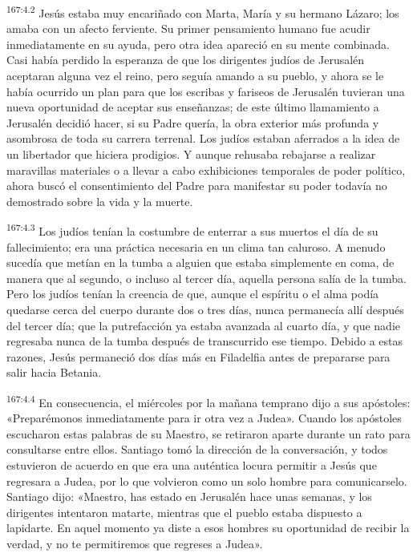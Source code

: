 \par 
\textsuperscript{167:4.2} Jesús estaba muy encariñado con Marta, María y su hermano Lázaro; los amaba con un afecto ferviente. Su primer pensamiento humano fue acudir inmediatamente en su ayuda, pero otra idea apareció en su mente combinada. Casi había perdido la esperanza de que los dirigentes judíos de Jerusalén aceptaran alguna vez el reino, pero seguía amando a su pueblo, y ahora se le había ocurrido un plan para que los escribas y fariseos de Jerusalén tuvieran una nueva oportunidad de aceptar sus enseñanzas; de este último llamamiento a Jerusalén decidió hacer, si su Padre quería, la obra exterior más profunda y asombrosa de toda su carrera terrenal. Los judíos estaban aferrados a la idea de un libertador que hiciera prodigios. Y aunque rehusaba rebajarse a realizar maravillas materiales o a llevar a cabo exhibiciones temporales de poder político, ahora buscó el consentimiento del Padre para manifestar su poder todavía no demostrado sobre la vida y la muerte.

\par 
\textsuperscript{167:4.3} Los judíos tenían la costumbre de enterrar a sus muertos el día de su fallecimiento; era una práctica necesaria en un clima tan caluroso. A menudo sucedía que metían en la tumba a alguien que estaba simplemente en coma, de manera que al segundo, o incluso al tercer día, aquella persona salía de la tumba. Pero los judíos tenían la creencia de que, aunque el espíritu o el alma podía quedarse cerca del cuerpo durante dos o tres días, nunca permanecía allí después del tercer día; que la putrefacción ya estaba avanzada al cuarto día, y que nadie regresaba nunca de la tumba después de transcurrido ese tiempo. Debido a estas razones, Jesús permaneció dos días más en Filadelfia antes de prepararse para salir hacia Betania.

\par 
\textsuperscript{167:4.4} En consecuencia, el miércoles por la mañana temprano dijo a sus apóstoles: «Preparémonos inmediatamente para ir otra vez a Judea». Cuando los apóstoles escucharon estas palabras de su Maestro, se retiraron aparte durante un rato para consultarse entre ellos. Santiago tomó la dirección de la conversación, y todos estuvieron de acuerdo en que era una auténtica locura permitir a Jesús que regresara a Judea, por lo que volvieron como un solo hombre para comunicarselo. Santiago dijo: «Maestro, has estado en Jerusalén hace unas semanas, y los dirigentes intentaron matarte, mientras que el pueblo estaba dispuesto a lapidarte. En aquel momento ya diste a esos hombres su oportunidad de recibir la verdad, y no te permitiremos que regreses a Judea».


